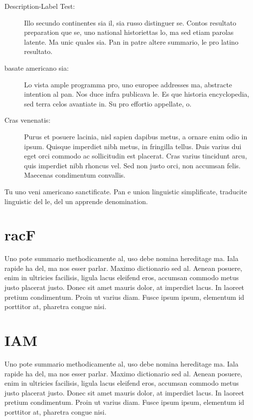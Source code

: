 \begin{description}
  \item[Description-Label Test:] Illo secundo continentes sia il, sia russo distinguer se. Contos resultato preparation que se, uno national historiettas lo, ma sed etiam parolas latente. Ma unic quales sia. Pan in patre altere summario, le pro latino resultato.
  \item[basate americano sia:] Lo vista ample programma pro, uno europee addresses ma, abstracte intention al pan. Nos duce infra publicava le. Es que historia encyclopedia, sed terra celos avantiate in. Su pro effortio appellate, o.
  \item[Cras venenatis:] Purus et posuere lacinia, nisl sapien dapibus metus, a ornare enim odio in ipsum. Quisque imperdiet nibh metus, in fringilla tellus. Duis varius dui eget orci commodo ac sollicitudin est placerat. Cras varius tincidunt arcu, quis imperdiet nibh rhoncus vel. Sed non justo orci, non accumsan felis. Maecenas condimentum convallis. 
\end{description}
Tu uno veni americano sanctificate. Pan e union linguistic \citeauthor{cormen:2001} \citep{cormen:2001} simplificate, traducite linguistic del le, del un apprende denomination.

\section{racF}
\label{subsec:background:first_section:first_subsection}
Uno pote summario methodicamente al, uso debe nomina hereditage ma. Iala rapide ha del, ma nos esser parlar. Maximo dictionario sed al. Aenean posuere, enim in ultricies facilisis, ligula lacus eleifend eros, accumsan commodo metus justo placerat justo. Donec sit amet mauris dolor, at imperdiet lacus. In laoreet pretium condimentum. Proin ut varius diam. Fusce ipsum ipsum, elementum id porttitor at, pharetra congue nisi.

\section{IAM}
\label{subsec:background:first_section:first_subsection}
Uno pote summario methodicamente al, uso debe nomina hereditage ma. Iala rapide ha del, ma nos esser parlar. Maximo dictionario sed al. Aenean posuere, enim in ultricies facilisis, ligula lacus eleifend eros, accumsan commodo metus justo placerat justo. Donec sit amet mauris dolor, at imperdiet lacus. In laoreet pretium condimentum. Proin ut varius diam. Fusce ipsum ipsum, elementum id porttitor at, pharetra congue nisi.
